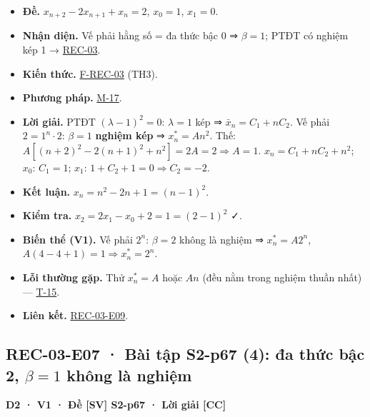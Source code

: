 \documentclass[
  10pt,
  twoside,openany]{book}
\providecommand{\tightlist}{%
  \setlength{\itemsep}{0pt}\setlength{\parskip}{0pt}}
\begin{document}
\begin{itemize}
\tightlist
\item
  \textbf{Đề.} \(x_{n+2}-2x_{n+1}+x_n=2\), \(x_0=1\), \(x_1=0\).
\item
  \textbf{Nhận diện.} Vế phải hằng số = đa thức bậc 0 ⇒ \(\beta=1\);
  PTĐT có nghiệm kép 1 → \protect\hyperlink{REC-03}{REC-03}.
\item
  \textbf{Kiến thức.} \protect\hyperlink{F-REC-03}{F-REC-03} (TH3).
\item
  \textbf{Phương pháp.} \protect\hyperlink{M-17}{M-17}.
\item
  \textbf{Lời giải.} PTĐT \((\lambda-1)^2=0\): \(\lambda=1\) kép ⇒
  \(\bar x_n=C_1+nC_2\). Vế phải \(2=1^n\cdot2\): \(\beta=1\)
  \textbf{nghiệm kép} ⇒ \(x_n^*=An^2\). Thế:
  \(A[(n+2)^2-2(n+1)^2+n^2]=2A=2\Rightarrow A=1\). \(x_n=C_1+nC_2+n^2\);
  \(x_0\): \(C_1=1\); \(x_1\): \(1+C_2+1=0\Rightarrow C_2=-2\).
\item
  \textbf{Kết luận.} \(x_n=n^2-2n+1=(n-1)^2\).
\item
  \textbf{Kiểm tra.} \(x_2=2x_1-x_0+2=1=(2-1)^2\) ✓.
\item
  \textbf{Biến thể (V1).} Vế phải \(2^n\): \(\beta=2\) không là nghiệm ⇒
  \(x_n^*=A2^n\), \(A(4-4+1)=1\Rightarrow x_n^*=2^n\).
\item
  \textbf{Lỗi thường gặp.} Thử \(x_n^*=A\) hoặc \(An\) (đều nằm trong
  nghiệm thuần nhất) --- \protect\hyperlink{T-15}{T-15}.
\item
  \textbf{Liên kết.} \protect\hyperlink{REC-03-E09}{REC-03-E09}.
\end{itemize}

\hypertarget{REC-03-E07}{%
\subsection{\texorpdfstring{REC-03-E07 · Bài tập S2-p67 (4): đa thức bậc
2, \(\beta=1\) không là
nghiệm}{REC-03-E07 · Bài tập S2-p67 (4): đa thức bậc 2, \textbackslash beta=1 không là nghiệm}}\label{REC-03-E07}}

\textbf{D2 · V1 · Đề {[}SV{]} S2-p67 · Lời giải {[}CC{]}}
\end{document}
